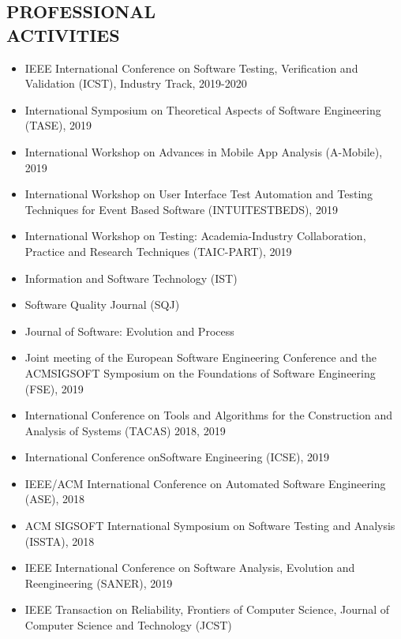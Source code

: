 \documentclass[margin]{res}
\begin{document}
\begin{resume}
\section{PROFESSIONAL\\ACTIVITIES}
\begin{itemize}[leftmargin=*]
    \item IEEE International Conference on Software Testing, Verification and Validation (ICST), Industry Track, 2019-2020
    \item International Symposium on Theoretical Aspects of Software Engineering (TASE), 2019
    \item International Workshop on Advances in Mobile App Analysis (A-Mobile), 2019
    \item International Workshop on User Interface Test Automation and Testing Techniques for Event Based Software (INTUITESTBEDS), 2019
    \item International Workshop on Testing: Academia-Industry Collaboration, Practice and Research Techniques (TAIC-PART), 2019
\end{itemize}
\begin{itemize}[leftmargin=*]
    \item Information and Software Technology (IST)
    \item Software Quality Journal (SQJ)
    \item Journal of Software: Evolution and Process 
\end{itemize}
\begin{itemize}[leftmargin=*]
    \item Joint meeting of the European Software Engineering Conference and the ACMSIGSOFT Symposium on the Foundations of Software Engineering (FSE), 2019
    \item International Conference on Tools and Algorithms for the Construction and Analysis of Systems (TACAS) 2018, 2019
    \item International Conference onSoftware Engineering (ICSE), 2019
    \item IEEE/ACM  International  Conference  on  Automated  Software  Engineering (ASE), 2018
    \item ACM SIGSOFT International Symposium on Software Testing and Analysis (ISSTA), 2018
    \item IEEE International Conference on Software Analysis, Evolution and Reengineering (SANER), 2019
    \item IEEE Transaction on Reliability, Frontiers of Computer Science, Journal of Computer Science and Technology (JCST)
\end{itemize}


\end{resume}
\end{document}
